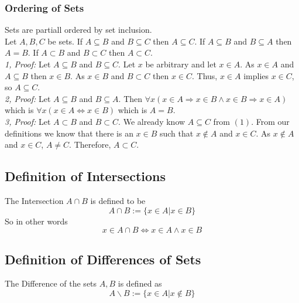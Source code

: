 \documentclass[]{scrbook}
\begin{document}
\subsubsection{Ordering of Sets}
Sets are partiall ordered by set inclusion.\\
Let $A,B,C$ be sets. If $A\subseteq B$ and $B\subseteq C$ then $A\subseteq C$. If $A\subseteq B$ and $B\subseteq A$ then $A=B$. If $A\subset B$ and $B\subset C$ then $A\subset C$.\\
\textit{1, Proof:} Let $A\subseteq B$ and $B\subseteq C$. Let $x$ be arbitrary and let $x\in A$. As $x\in A$ and $A\subseteq B$ then $x\in B$. As $x\in B$ and $B\subset C$ then $x\in C$. Thus, $x\in A$ implies $x\in C$, so $A\subseteq C$.\\
\textit{2, Proof:} Let $A\subseteq B$ and $B\subseteq A$. Then $\forall x (x\in A \Rightarrow x\in B \wedge x\in B \Rightarrow x\in A)$ which is $\forall x (x\in A \Leftrightarrow x\in B)$ which is $A = B$.\\
\textit{3, Proof:} Let $A\subset B$ and $B\subset C$. We already know $A\subseteq C$ from $(1)$. From our definitions we know that there is an $x\in B$ such that $x\notin A$ and $x\in C$. As $x\notin A$ and $x\in C$, $A \neq C$. Therefore, $A\subset C$.

\subsection{Definition of Intersections}
The Intersection $A\cap B$ is defined to be
\begin{equation}
	A\cap B := \{x\in A | x\in B\}
\end{equation}
So in other words
\begin{equation}
	x\in A\cap B \Leftrightarrow x\in A \wedge x\in B
\end{equation}

\subsection{Definition of Differences of Sets}
The Difference of the sets $A,B$ is defined as
\begin{equation}
	A\backslash B := \{x\in A| x\notin B\}
\end{equation}
\end{document}
